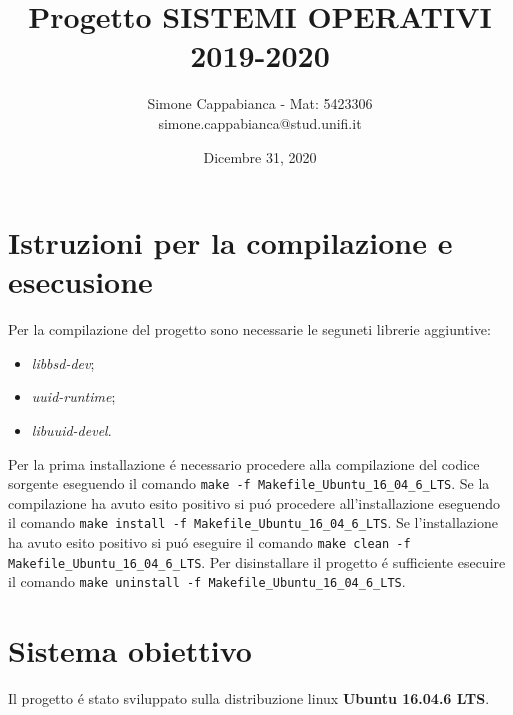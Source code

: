 \documentclass[11pt, oneside]{article}   	%
\title{Progetto SISTEMI OPERATIVI 2019-2020}
\author{Simone Cappabianca - Mat: 5423306 \\  simone.cappabianca@stud.unifi.it}
\date{Dicembre 31, 2020}							%
\begin{document}
\maketitle
\newpage

\tableofcontents
\newpage

\section{Istruzioni per la compilazione e esecusione}
Per la compilazione del progetto sono necessarie le seguneti librerie aggiuntive:
\begin{itemize}
	\item \textit{libbsd-dev};
	\item \textit{uuid-runtime};
	\item \textit{libuuid-devel}.
\end{itemize} 

Per la prima installazione \'e necessario procedere alla compilazione del codice sorgente eseguendo il comando \texttt{make -f Makefile\_Ubuntu\_16\_04\_6\_LTS}. Se la compilazione ha avuto esito positivo si pu\'o procedere all'installazione eseguendo il comando \texttt{make install -f Makefile\_Ubuntu\_16\_04\_6\_LTS}. Se l'installazione ha avuto esito positivo si pu\'o eseguire il comando \texttt{make clean -f Makefile\_Ubuntu\_16\_04\_6\_LTS}. Per disinstallare il progetto \'e sufficiente esecuire il comando \texttt{make uninstall -f Makefile\_Ubuntu\_16\_04\_6\_LTS}. \par

\section{Sistema obiettivo}
Il progetto \'e stato sviluppato sulla distribuzione linux \textbf{Ubuntu 16.04.6 LTS}.
\end{document}
